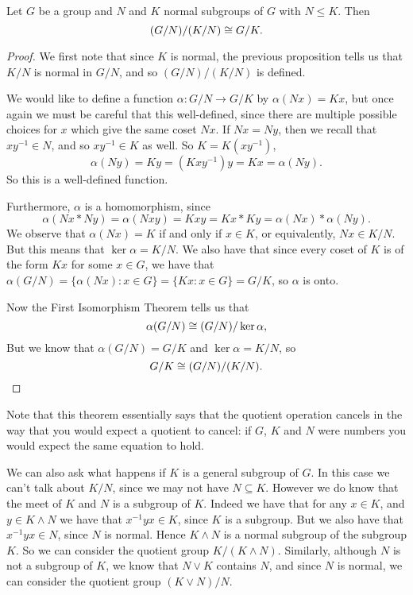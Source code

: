 \begin{theorem}
  Let $G$ be a group and $N$ and $K$ normal subgroups of $G$ with $N 
  \le K$.  Then
  \[
    (G/N)/(K/N) \cong G/K.
  \]
\end{theorem}
\begin{proof}
  We first note that since $K$ is normal, the previous proposition tells us 
  that $K/N$ is normal in $G/N$, and so $(G/N)/(K/N)$ is defined.
  
  We would like to define a function $\alpha: G/N \to G/K$ by 
  $\alpha(Nx) = Kx$, but once again we must be careful that this 
  well-defined, since there are multiple possible choices for $x$ 
  which give the same coset $Nx$.  If $Nx = Ny$, then we recall that 
  $xy^{-1} \in N$, and so $xy^{-1} \in K$ as well.  So $K = 
  K(xy^{-1})$,
  \[
    \alpha(Ny) = Ky = (Kxy^{-1})y = Kx = \alpha(Ny).
  \]
  So this is a well-defined function.
  
  Furthermore, $\alpha$ is a homomorphism, since
  \[
    \alpha(Nx \ast Ny) = \alpha(Nxy) = Kxy = Kx \ast Ky = \alpha(Nx) 
    \ast \alpha(Ny).
  \]
  We observe that $\alpha(Nx) = K$ if and only if $x \in K$, or
  equivalently, $Nx \in K/N$.  But this means that $\ker \alpha =
  K/N$.  We also have that since every coset of $K$ is of the form 
  $Kx$ for some $x \in G$, we have that $\alpha(G/N) = \{ \alpha(Nx) : 
  x \in G \} = \{ Kx : x \in G\} = G/K$, so $\alpha$ is onto.
  
  Now the First Isomorphism Theorem tells us that
  \[
    \alpha(G/N) \cong (G/N)/\ker \alpha,
  \]
  But we know that $\alpha(G/N) = G/K$ and $\ker \alpha = K/N$, so
  \[
    G/K \cong (G/N)/(K/N).
  \]
\end{proof}

Note that this theorem essentially says that the quotient operation
cancels in the way that you would expect a quotient to cancel: if $G$,
$K$ and $N$ were numbers you would expect the same equation to hold.

We can also ask what happens if $K$ is a general subgroup of $G$.  In
this case we can't talk about $K/N$, since we may not have $N
\subseteq K$.  However we do know that the meet of $K$ and $N$ is a
subgroup of $K$.  Indeed we have that for any $x \in K$, and $y \in K
\wedge N$ we have that $x^{-1}yx \in K$, since $K$ is a subgroup.  But
we also have that $x^{-1}yx \in N$, since $N$ is normal.  Hence $K
\wedge N$ is a normal subgroup of the subgroup $K$.  So we can
consider the quotient group $K/(K \wedge N)$.  Similarly, although $N$
is not a subgroup of $K$, we know that $N \vee K$ contains $N$, and
since $N$ is normal, we can consider the quotient group $(K \vee N)/N$.

